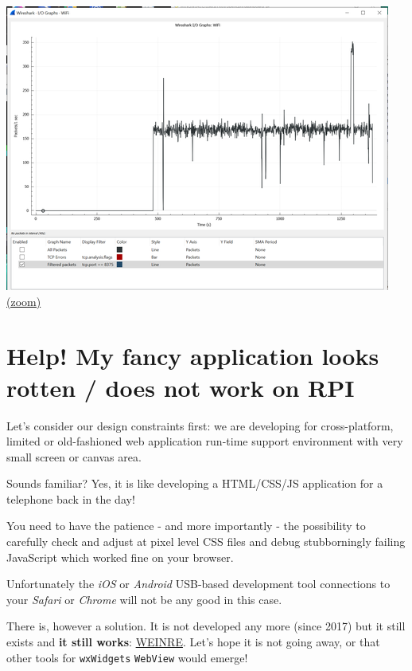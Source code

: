 \documentclass[11pt]{article}
\begin{document}
    \includegraphics{2020-02-09_wireshark_wifi_rate_8375TCP_procexp_01_instrujs_clients_alpha_02_sk1-21-0_RPIclient_WinSKsrv.png}
\href{2020-02-09_wireshark_wifi_rate_8375TCP_procexp_01_instrujs_clients_alpha_02_sk1-21-0_RPIclient_WinSKsrv.png}{(zoom)}

    \hypertarget{help-my-fancy-application-looks-rotten-does-not-work-on-rpi}{%
\section{Help! My fancy application looks rotten / does not work on
RPI}\label{help-my-fancy-application-looks-rotten-does-not-work-on-rpi}}

    Let's consider our design constraints first: we are developing for
cross-platform, limited or old-fashioned web application run-time
support environment with very small screen or canvas area.

    Sounds familiar? Yes, it is like developing a HTML/CSS/JS application
for a telephone back in the day!

    You need to have the patience - and more importantly - the possibility
to carefully check and adjust at pixel level CSS files and debug
stubborningly failing JavaScript which worked fine on your browser.

    Unfortunately the \emph{iOS} or \emph{Android} USB-based development
tool connections to your \emph{Safari} or \emph{Chrome} will not be any
good in this case.

    There is, however a solution. It is not developed any more (since 2017)
but it still exists and \textbf{it still works}:
\href{https://people.apache.org/~pmuellr/weinre/docs/latest/}{WEINRE}.
Let's hope it is not going away, or that other tools for
\texttt{wxWidgets} \texttt{WebView} would emerge!
\end{document}
